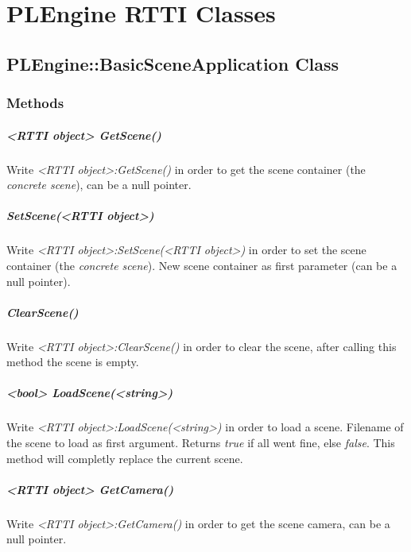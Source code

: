\chapter{PLEngine RTTI Classes}




\section{PLEngine::BasicSceneApplication Class}


\subsection{Methods}

\paragraph{<RTTI object> GetScene()}
Write \emph{<RTTI object>:GetScene()} in order to get the scene container (the \emph{concrete scene}), can be a null pointer.

\paragraph{SetScene(<RTTI object>)}
Write \emph{<RTTI object>:SetScene(<RTTI object>)} in order to set the scene container (the \emph{concrete scene}). New scene container as first parameter (can be a null pointer).

\paragraph{ClearScene()}
Write \emph{<RTTI object>:ClearScene()} in order to clear the scene, after calling this method the scene is empty.

\paragraph{<bool> LoadScene(<string>)}
Write \emph{<RTTI object>:LoadScene(<string>)} in order to load a scene. Filename of the scene to load as first argument. Returns \emph{true} if all went fine, else \emph{false}. This method will completly replace the current scene.

\paragraph{<RTTI object> GetCamera()}
Write \emph{<RTTI object>:GetCamera()} in order to get the scene camera, can be a null pointer.

